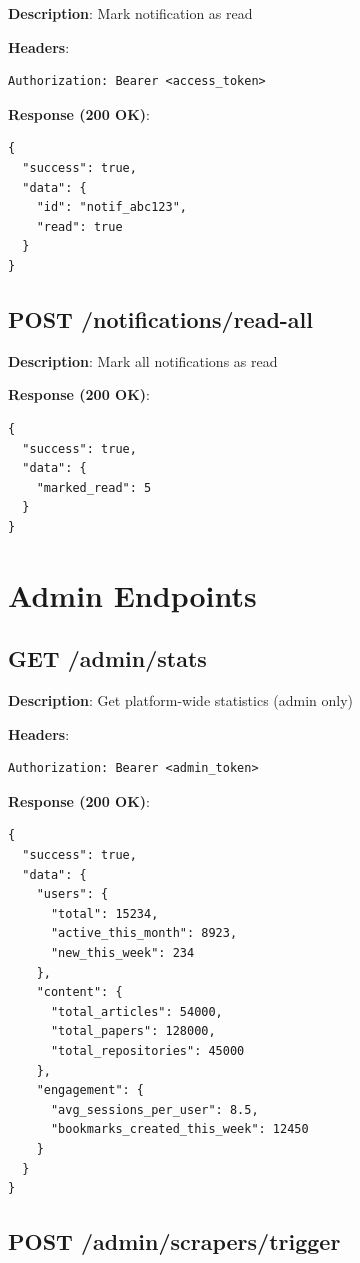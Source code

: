 \documentclass[12pt,a4paper]{report}
\begin{document}
\textbf{Description}: Mark notification as read

\textbf{Headers}:
\begin{lstlisting}
Authorization: Bearer <access_token>
\end{lstlisting}

\textbf{Response (200 OK)}:
\begin{lstlisting}
{
  "success": true,
  "data": {
    "id": "notif_abc123",
    "read": true
  }
}
\end{lstlisting}

\section{POST /notifications/read-all}

\textbf{Description}: Mark all notifications as read

\textbf{Response (200 OK)}:
\begin{lstlisting}
{
  "success": true,
  "data": {
    "marked_read": 5
  }
}
\end{lstlisting}

\chapter{Admin Endpoints}

\section{GET /admin/stats}

\textbf{Description}: Get platform-wide statistics (admin only)

\textbf{Headers}:
\begin{lstlisting}
Authorization: Bearer <admin_token>
\end{lstlisting}

\textbf{Response (200 OK)}:
\begin{lstlisting}
{
  "success": true,
  "data": {
    "users": {
      "total": 15234,
      "active_this_month": 8923,
      "new_this_week": 234
    },
    "content": {
      "total_articles": 54000,
      "total_papers": 128000,
      "total_repositories": 45000
    },
    "engagement": {
      "avg_sessions_per_user": 8.5,
      "bookmarks_created_this_week": 12450
    }
  }
}
\end{lstlisting}

\section{POST /admin/scrapers/trigger}
\end{document}
